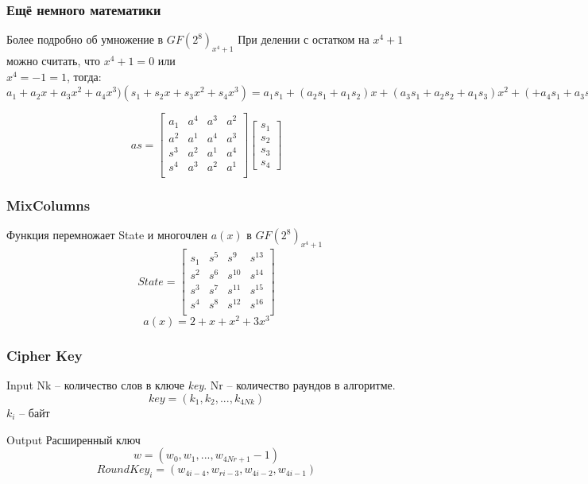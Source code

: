 \documentclass[10pt, typeface=serif(roman), pdf,hyperref={unicode}, aspectratio=169]{beamer}
\begin{document}
\begin{frame}
	\frametitle{Ещё немного математики}
	\begin{block}
		{
			Более подробно об умножение в \( GF(2^8)_{x^4+1}\)
		}
		При делении с остатком на \(x^4+1\) можно считать, что \(x^4 + 1 = 0\) или \\
		\(x^4=-1=1\), тогда:
		\(a_1+a_2x+a_3x^2+a_4x^3)(s_1+s_2x+s_3x^2+s_4x^3)=a_1s_1+(a_2s_1+a_1s_2)x+(a_3s_1+a_2s_2+a_1s_3)x^2+(+a_4s_1+a_3s_2+a_2s_3+a-1s_4)x^3+(a_4s_2+a_3s_3+a_2s_4)x^4+(a_4s_3+a_3+s_4)x^5+a_4s_4x^6 = a_1s_1+a_4s_2+a_3s_3+a_2s_4+(s_1+s_2x+s_3x^2+s_4x^3)x+(a_3s_1+a_2s_2+a_1s_3+a_4s_4)x^2+(+a_4s_1+a_3s_2+a_2s_3+a_1s_4)x^3\)
	\end{block}
	\[as =
	\begin{bmatrix}
		a_1 & a^4 & a^3 & a^2 \\
		a^2 & a^1 & a^4 & a^3 \\
		s^3 & a^2 & a^1 & a^4 \\
		s^4 & a^3 & a^2 & a^1 \\
	\end{bmatrix}
	\begin{bmatrix}
		s_1 \\ s_2 \\ s_3 \\s_4
	\end{bmatrix}\]
\end{frame}



\begin{frame}
	\frametitle{MixColumns}
	\begin{block}
		{
			Функция перемножает State и многочлен \(a(x)\) в \(GF(2^8)_{x^4+1}\)
		}
		\[State =
		\begin{bmatrix}
			s_1 & s^5 & s^9 & s^{13} \\
			s^2 & s^6 & s^{10} & s^{14} \\
			s^3 & s^7 & s^{11} & s^{15} \\
			s^4 & s^8 & s^{12} & s^{16} \\
		\end{bmatrix}\]
		\[a(x) = 2+x+x^2+3x^3\]
		
	\end{block}
\end{frame}



\begin{frame}
	\frametitle{Cipher Key}
	\begin{block}
		{
			Input
		}
		Nk -- количество слов в ключе \textit{key}.
		Nr -- количество раундов в алгоритме.
		\[key = (k_1,k_2,...,k_{4Nk})\]
		\(k_i\) -- байт
		
	\end{block}
	\begin{block}
		{
			Output
		}
		Расширенный ключ
		\[w = (w_0,w_1,...,w_{4Nr+1}-1)\]
		\[RoundKey_i = (w_{4i-4},w_{ri-3},w_{4i-2},w_{4i-1})\]
	\end{block}
\end{frame}
\end{document}
